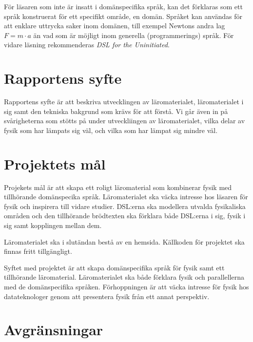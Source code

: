 För läsaren som inte är insatt i domänspecifika språk, kan det
förklaras som ett språk konstruerat för ett specifikt område, en
domän. Språket kan användas för att enklare uttrycka saker inom
domänen, till exempel Newtons andra lag $F=m \cdot a$ än vad som är
möjligt inom generella (programmerings) språk. För vidare läsning
rekommenderas \textit{DSL for the Uninitiated}.\cite{DSLU}

\section{Rapportens syfte}

\begin{binge}
Rapportens syfte är att beskriva utvecklingen av läromaterialet, läromaterialet
i sig samt den tekniska bakgrund som krävs för att förstå. Vi går även in på
svårigheterna som stötts på under utveckliingen av läromaterialet, vilka delar
av fysik som har lämpats sig väl, och vilka som har lämpat sig mindre väl.
\end{binge}

\section{Projektets mål}

\begin{binge}
Projekets mål är att skapa ett roligt läromaterial som kombinerar fysik med
tillhörande domänspecika språk. Läromaterialet ska väcka intresse hos läsaren
för fysik och inspirera till vidare studier. DSL:erna ska modellera utvalda
fysikaliska områden och den tillhörande brödtexten ska förklara både DSL:erna i
sig, fysik i sig samt kopplingen mellan dem.

Läromaterialet ska i slutändan bestå av en hemsida. Källkoden för projektet
ska finnas fritt tillgängligt.

Syftet med projektet är att skapa domänspecifika språk för fysik samt ett
tillhörande läromaterial. Läromaterialet ska både förklara fysik och
parallellerna med de domänspecifika språken. Förhoppningen är att väcka intresse
för fysik hos datateknologer genom att presentera fysik från ett annat
perspektiv.

\end{binge}

\section{Avgränsningar}

